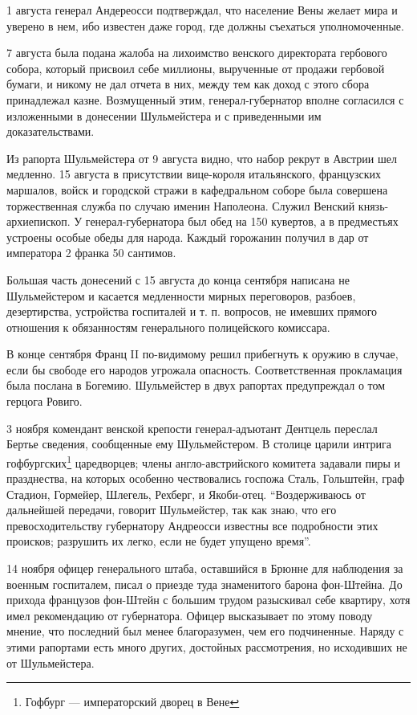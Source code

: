 \documentclass[
  oneside,
  12pt,
  titlepage]{book}
\begin{document}
1 августа генерал Андереосси подтверждал, что население Вены желает мира и уверено в нем, ибо известен даже город, где должны съехаться уполномоченные.

7 августа была подана жалоба на лихоимство венского директората гербового собора, который присвоил себе миллионы, вырученные от продажи гербовой бумаги, и никому не дал отчета в них, между тем как доход с этого сбора принадлежал казне. Возмущенный этим, генерал-губернатор вполне согласился с изложенными в донесении Шульмейстера и с приведенными им доказательствами.

Из рапорта Шульмейстера от 9 августа видно, что набор рекрут в Австрии шел медленно. 15 августа в присутствии вице-короля итальянского, французских маршалов, войск и городской стражи в кафедральном соборе была совершена торжественная служба по случаю именин Наполеона. Служил Венский князь-архиепископ. У генерал-губернатора был обед на 150 кувертов, а в предместьях устроены особые обеды для народа. Каждый горожанин получил в дар от императора 2 франка 50 сантимов.

Большая часть донесений с 15 августа до конца сентября написана не Шульмейстером и касается медленности мирных переговоров, разбоев, дезертирства, устройства госпиталей и т. п. вопросов, не имевших прямого отношения к обязанностям генерального полицейского комиссара.

В конце сентября Франц II по-видимому решил прибегнуть к оружию в случае, если бы свободе его народов угрожала опасность. Соответственная прокламация была послана в Богемию. Шульмейстер в двух рапортах предупреждал о том герцога Ровиго.

3 ноября комендант венской крепости генерал-адъютант Дентцель переслал Бертье сведения, сообщенные ему Шульмейстером. В столице царили интрига гофбургских\footnote{Гофбург --- императорский дворец в Вене} царедворцев; члены англо-австрийского комитета задавали пиры и празднества, на которых особенно чествовались госпожа Сталь, Гольштейн, граф Стадион, Гормейер, Шлегель, Рехберг, и Якоби-отец. ``Воздерживаюсь от дальнейшей передачи, говорит Шульмейстер, так как знаю, что его превосходительству губернатору Андреосси известны все подробности этих происков; разрушить их легко, если не будет упущено время''.

14 ноября офицер генерального штаба, оставшийся в Брюнне для наблюдения за военным госпиталем, писал о приезде туда знаменитого барона фон-Штейна. До прихода французов фон-Штейн с большим трудом разыскивал себе квартиру, хотя имел рекомендацию от губернатора. Офицер высказывает по этому поводу мнение, что последний был менее благоразумен, чем его подчиненные. Наряду с этими рапортами есть много других, достойных рассмотрения, но исходивших не от Шульмейстера.
\end{document}
